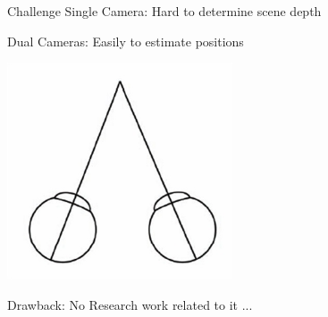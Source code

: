 \documentclass{beamer}
\begin{document}
	\begin{frame}{Challenge}
		Single Camera: Hard to determine scene depth \\
		\uncover<2->
		{
			Dual Cameras: Easily to estimate positions
			\begin{center}
				\includegraphics[width=0.5\textwidth]{./pics/dual.jpg} 
			\end{center}
		}
		{
			Drawback: No Research work related to it ...
		}
	\end{frame}
	
\end{document}
